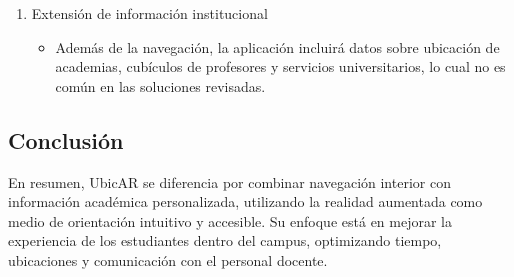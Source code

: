 \begin{enumerate}
\begin{itemize}
	\end{itemize}
	
	\item Extensión de información institucional
	
	\begin{itemize}
		
		\item Además de la navegación, la aplicación incluirá datos sobre ubicación de academias, cubículos de profesores y servicios universitarios, lo cual no es común en las soluciones revisadas.
		
	\end{itemize}
	
\end{enumerate}

\subsection{Conclusión}

En resumen, UbicAR se diferencia por combinar navegación interior con información académica personalizada, utilizando la realidad aumentada como medio de orientación intuitivo y accesible. Su enfoque está en mejorar la experiencia de los estudiantes dentro del campus, optimizando tiempo, ubicaciones y comunicación con el personal docente.